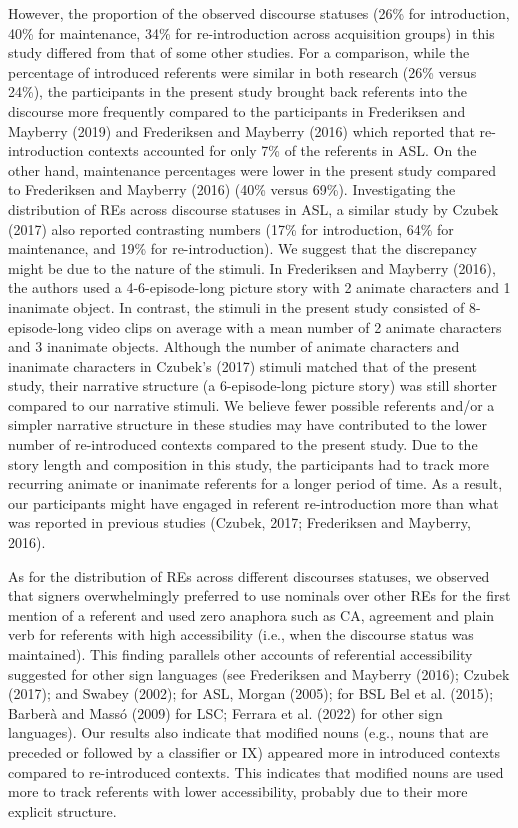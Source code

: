 \documentclass[]{elsarticle} %
\begin{document}
However, the proportion of the observed discourse statuses (26\% for
introduction, 40\% for maintenance, 34\% for re-introduction across
acquisition groups) in this study differed from that of some other
studies. For a comparison, while the percentage of introduced referents
were similar in both research (26\% versus 24\%), the participants in
the present study brought back referents into the discourse more
frequently compared to the participants in Frederiksen and Mayberry
(2019) and Frederiksen and Mayberry (2016) which reported that
re-introduction contexts accounted for only 7\% of the referents in ASL.
On the other hand, maintenance percentages were lower in the present
study compared to Frederiksen and Mayberry (2016) (40\% versus 69\%).
Investigating the distribution of REs across discourse statuses in ASL,
a similar study by Czubek (2017) also reported contrasting numbers (17\%
for introduction, 64\% for maintenance, and 19\% for re-introduction).
We suggest that the discrepancy might be due to the nature of the
stimuli. In Frederiksen and Mayberry (2016), the authors used a
4-6-episode-long picture story with 2 animate characters and 1 inanimate
object. In contrast, the stimuli in the present study consisted of
8-episode-long video clips on average with a mean number of 2 animate
characters and 3 inanimate objects. Although the number of animate
characters and inanimate characters in Czubek's (2017) stimuli matched
that of the present study, their narrative structure (a 6-episode-long
picture story) was still shorter compared to our narrative stimuli. We
believe fewer possible referents and/or a simpler narrative structure in
these studies may have contributed to the lower number of re-introduced
contexts compared to the present study. Due to the story length and
composition in this study, the participants had to track more recurring
animate or inanimate referents for a longer period of time. As a result,
our participants might have engaged in referent re-introduction more
than what was reported in previous studies (Czubek, 2017; Frederiksen
and Mayberry, 2016).

As for the distribution of REs across different discourses statuses, we
observed that signers overwhelmingly preferred to use nominals over
other REs for the first mention of a referent and used zero anaphora
such as CA, agreement and plain verb for referents with high
accessibility (i.e., when the discourse status was maintained). This
finding parallels other accounts of referential accessibility suggested
for other sign languages (see Frederiksen and Mayberry (2016); Czubek
(2017); and Swabey (2002); for ASL, Morgan (2005); for BSL Bel et al.
(2015); Barberà and Massó (2009) for LSC; Ferrara et al. (2022) for
other sign languages). Our results also indicate that modified nouns
(e.g., nouns that are preceded or followed by a classifier or IX)
appeared more in introduced contexts compared to re-introduced contexts.
This indicates that modified nouns are used more to track referents with
lower accessibility, probably due to their more explicit structure.
\end{document}
